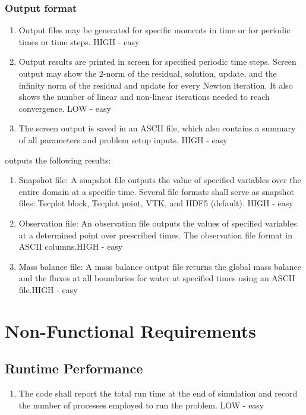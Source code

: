 \subsubsection{Output format}
\begin{enumerate}[resume]
	\item Output files may be generated for specific moments in time or for periodic times or time steps. \label{outputSpecs} HIGH - easy
	\item Output results are printed in screen for specified periodic time steps. Screen output may show the 2-norm of the residual, solution, update, and the infinity norm of the residual and update for every Newton iteration. It also shows the number of linear and non-linear iterations needed to reach convergence. \label{outputPrintScreen} LOW - easy
	\item The screen output is saved in an ASCII file, which also contains a summary of all parameters and problem setup inputs. \label{outputFile} HIGH - easy
\end{enumerate}

\pft outputs the following results: 

\begin{enumerate}[resume]
	\item Snapshot file: \label{outSnapshot}A snapshot file outputs the value of specified variables over the entire domain at a specific time. Several file formats shall serve as snapshot files: Tecplot block, Tecplot point, VTK, and HDF5 (default). HIGH - easy
	\item Observation file: \label{outObservation}An observation file outputs the values of specified variables at a determined point over prescribed times. The observation file format in ASCII columns.HIGH - easy
	\item Mass balance file: \label{outMassBalance}A mass balance output file returns the global mass balance and the fluxes at all boundaries for water at specified times using an ASCII file.HIGH - easy
\end{enumerate}

\section{Non-Functional Requirements}
\subsection{Runtime Performance}
\begin{enumerate}
	\item The code shall report the total run time at the end of simulation and record the number of processes employed to run the problem. LOW - easy
\end{enumerate}

